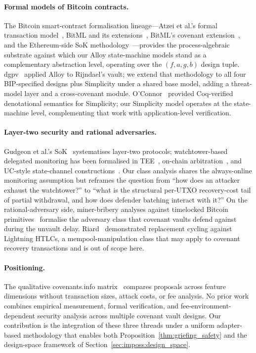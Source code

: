 \paragraph{Formal models of Bitcoin contracts.}
The Bitcoin smart-contract formalisation lineage---Atzei et al.'s
formal transaction model~\cite{ABLZ18}, BitML and its
extensions~\cite{BZ18,ABL19,BLM22}, BitML's covenant
extension~\cite{BLZ20}, and the Ethereum-side SoK
methodology~\cite{ABC17}---provides the process-algebraic substrate
against which our Alloy state-machine models stand as a
complementary abstraction level, operating over the $(f, a, g, b)$
design tuple. dgpv~\cite{dgpv24} applied Alloy to Rijndael's
\opcat{} vault; we extend that methodology to all four BIP-specified
designs plus Simplicity under a shared base model, adding a
threat-model layer and a cross-covenant module.
O'Connor~\cite{OC17} provided Coq-verified denotational semantics
for Simplicity; our Simplicity model operates at the state-machine
level, complementing that work with application-level verification.

\paragraph{Layer-two security and rational adversaries.}
Gudgeon et al.'s SoK~\cite{GMRMG20} systematises layer-two
protocols; watchtower-based delegated monitoring has been
formalised in TEE~\cite{LGSM19}, on-chain
arbitration~\cite{McCorry19}, and UC-style state-channel
constructions~\cite{DFH18,DEFM19,ABEFHMM21,Aumayr24}. Our class \classscale{}
analysis shares the always-online monitoring assumption but reframes
the question from ``how does an attacker exhaust the watchtower?''
to ``what is the structural per-UTXO recovery-cost tail of partial
withdrawal, and how does defender batching interact with it?'' On the
rational-adversary side, miner-bribery analyses against timelocked
Bitcoin primitives~\cite{TYME21,WSZN23,NKW21} formalise the
adversary class that covenant vaults defend against during the
unvault delay. Riard~\cite{Ria23} demonstrated replacement cycling
against Lightning HTLCs, a mempool-manipulation class that may
apply to covenant recovery transactions and is out of scope here.

\paragraph{Positioning.}
The qualitative covenants.info matrix~\cite{covenants_info}
compares proposals across feature dimensions without transaction
sizes, attack costs, or fee analysis. No prior work combines
empirical measurement, formal verification, and
fee-environment-dependent security analysis across multiple
covenant vault designs. Our contribution is the integration of
these three threads under a uniform adapter-based methodology
that enables both Proposition~\ref{thm:griefing_safety} and the
design-space framework of Section~\ref{sec:imposs:design_space}.

\providecommand{\todo}[2][]{\textbf{[TODO: #2]}}
